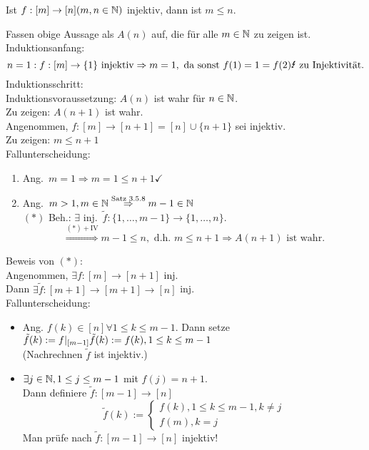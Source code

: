 \documentclass[../ana1.tex]{subfiles}
\begin{document}
\begin{satz}[Schubfachprinzip]
	Ist \(f:[m]\rightarrow [n] (m,n\in\mathbb{N}) \) injektiv, dann ist \(m\leq n\).
\end{satz}
\begin{bew}
	Fassen obige Aussage als \(A(n)\) auf, die für alle \(m\in\mathbb{N} \) zu zeigen ist.\\
	Induktionsanfang:
	\[ n=1: f:[m] \rightarrow \{1\} \text{ injektiv} \Rightarrow m=1, \text{ da sonst } f(1) = 1 = f(2) \text{\Lightning{} zu Injektivität}.\]
	Induktionsschritt:\\
	Induktionsvoraussetzung: \(A(n)\) ist wahr für \(n\in\mathbb{N} \).\\
	Zu zeigen: \(A(n+1)\) ist wahr.\\
	Angenommen, \(f:[m]\rightarrow[n+1] = [n] \cup \{n+1\} \) sei injektiv.\\
	Zu zeigen: \(m\leq n+1\) \\
	Fallunterscheidung:
	\begin{enumerate}
		\item Ang.\  \(m=1 \Rightarrow m=1\leq n+1\checkmark{}\)
		\item Ang.\  \(m>1, m\in\mathbb{N} \overset{\text{Satz 3.5.8}}{\Rightarrow} m-1\in\mathbb{N} \) \\
		      \((*)\) Beh.: \(\exists \) inj.\  \(\tilde{f}: \{1,\ldots,m-1\}\rightarrow \{1,\ldots,n\} \).\\
		      \[ \overset{(*) + \text{IV}}{\Rightarrow} m-1\leq n, \text{ d.h. } m\leq n+1 \Rightarrow A(n+1) \text{ ist wahr}.\]
	\end{enumerate}
	Beweis von \((*)\):\\
	Angenommen, \(\exists f: [m]\rightarrow[n+1]\) inj.\\
	Dann \(\exists \tilde{f}: [m+1]\rightarrow [m+1]\rightarrow[n]\) inj.\\
	Fallunterscheidung:
	\begin{itemize}
		\item Ang. \(f(k)\in [n] \forall 1\leq k \leq m-1\). Dann setze \(\tilde{f}(k) := f\vert_{[m-1]}\\
			  \tilde{f}(k) := f(k), 1\leq k\leq m-1\) \\
		      (Nachrechnen \(\tilde{f}\) ist injektiv.)
		\item \(\exists j\in\mathbb{N}, 1\leq j\leq m-1\) mit \(f(j) = n+1\).\\
		      Dann definiere \(\tilde{f}: [m-1]\rightarrow [n]\)
		      \[\tilde{f}(k) :=
			      	\begin{cases}
				    	f(k), 1 \leq k \leq m-1, k\neq j \\
				      	f(m), k=j
			      	\end{cases}\]
		      Man prüfe nach \(\tilde{f}: [m-1]\rightarrow [n]\) injektiv!
	\end{itemize}
\end{bew}
\end{document}
